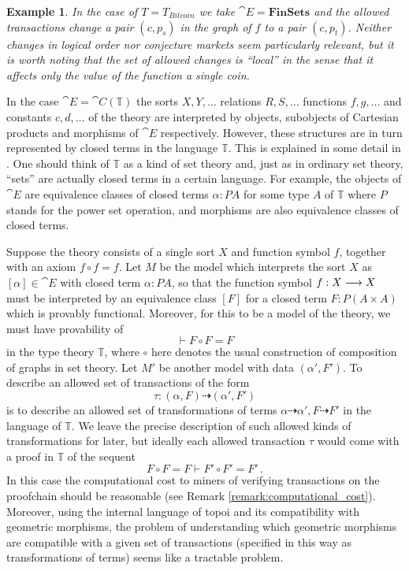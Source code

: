 \documentclass[english,letter paper,12pt,reqno]{article}
\theoremstyle{example}
\newtheorem{example}[theorem]{Example}
\begin{document}
\begin{example} In the case of $T = T_{Bitcoin}$ we take $\cat{E} = \textbf{FinSets}$ and the allowed transactions change a pair $(c,p_s)$ in the graph of $f$ to a pair $(c,p_t)$. Neither changes in logical order nor conjecture markets seem particularly relevant, but it is worth noting that the set of allowed changes is ``local'' in the sense that it affects only the value of the function a single coin.
\end{example}

In the case $\cat{E} = \cat{C}(\mathbb{T})$ the sorts $X,Y,\ldots$ relations $R,S,\ldots$ functions $f,g,\ldots$ and constants $c,d,\ldots$ of the theory are interpreted by objects, subobjects of Cartesian products and morphisms of $\cat{E}$ respectively. However, these structures are in turn represented by closed terms in the language $\mathbb{T}$. This is explained in some detail in \cite[Lecture 15]{risingseminar}. One should think of $\mathbb{T}$ as a kind of set theory and, just as in ordinary set theory, ``sets'' are actually closed terms in a certain language. For example, the objects of $\cat{E}$ are equivalence classes of closed terms $\alpha: PA$ for some type $A$ of $\mathbb{T}$ where $P$ stands for the power set operation, and morphisms are also equivalence classes of closed terms.

Suppose the theory consists of a single sort $X$ and function symbol $f$, together with an axiom $f \circ f = f$. Let $M$ be the model which interprets the sort $X$ as $[\alpha] \in \cat{E}$ with closed term $\alpha: PA$, so that the function symbol $f: X \longrightarrow X$ must be interpreted by an equivalence class $[F]$ for a closed term $F: P(A \times A)$ which is provably functional. Moreover, for this to be a model of the theory, we must have provability of
\[
\vdash F \circ F = F
\]
in the type theory $\mathbb{T}$, where $\circ$ here denotes the usual construction of composition of graphs in set theory. Let $M'$ be another model with data $(\alpha', F')$. To describe an allowed set of transactions of the form
\[
\tau: (\alpha, F) \dashrightarrow (\alpha', F')
\]
is to describe an allowed set of transformations of terms $\alpha \dashrightarrow \alpha', F \dashrightarrow F'$ in the language of $\mathbb{T}$. We leave the precise description of such allowed kinds of transformations for later, but ideally each allowed transaction $\tau$ would come with a proof in $\mathbb{T}$ of the sequent
\[
F \circ F = F \vdash F' \circ F' = F'\,.
\]
In this case the computational cost to miners of verifying transactions on the proofchain should be reasonable (see Remark \ref{remark:computational_cost}). Moreover, using the internal language of topoi and its compatibility with geometric morphisms, the problem of understanding which geometric morphisms are compatible with a given set of transactions (specified in this way as transformations of terms) seems like a tractable problem.
\end{document}
